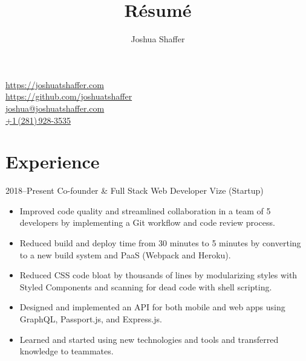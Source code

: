 \documentclass{resume}
\title{R\'esum\'e}
\author{Joshua Shaffer}
\begin{document}
{\Huge\bfseries\theauthor}
\hfill
\begin{minipage}[c]{.50\textwidth}
    \begin{center}
        \href{https://joshuatshaffer.com}{https://joshuatshaffer.com} \\[0.3em]
        \href{https://github.com/joshuatshaffer}{https://github.com/joshuatshaffer} \\[0.3em]
        \href{mailto:joshua@joshuatshaffer.com}{joshua@joshuatshaffer.com} \\[0.3em]
        \href{tel:+12819283535}{+1\,(281)\,928-3535}
    \end{center}
\end{minipage}

\section{Experience}

\entry
{2018--Present} %
{Co-founder \& Full Stack Web Developer}
{Vize (Startup)}
{
    \begin{itemize}
        \item Improved code quality and streamlined collaboration in a team of 5
              developers by implementing a Git workflow and code review process.
        \item Reduced build and deploy time from 30 minutes to 5 minutes by
              converting to a new build system and PaaS (Webpack and Heroku).
        \item Reduced CSS code bloat by thousands of lines by modularizing
              styles with Styled Components and scanning for dead code with
              shell scripting.
        \item Designed and implemented an API for both mobile and web apps using
              GraphQL, Passport.js, and Express.js.
        \item Learned and started using new technologies and tools and
              transferred knowledge to teammates.
    \end{itemize}
}
\end{document}
